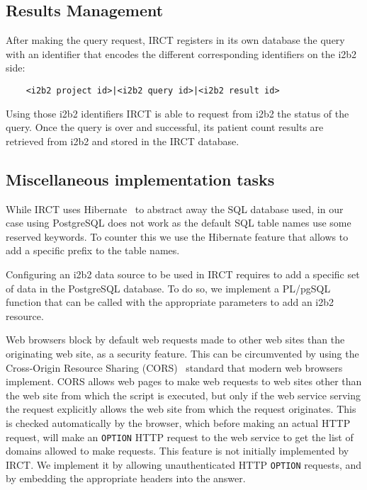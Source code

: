 \subsection{Results Management}

After making the query request, IRCT registers in its own database the query with an identifier that encodes the different corresponding identifiers on the i2b2 side:
\begin{verbatim}
    <i2b2 project id>|<i2b2 query id>|<i2b2 result id>
\end{verbatim}

Using those i2b2 identifiers IRCT is able to request from i2b2 the status of the query.
Once the query is over and successful, its patient count results are retrieved from i2b2 and stored in the IRCT database.


\subsection{Miscellaneous implementation tasks}

While IRCT uses Hibernate~\cite{wiki:hibernate} to abstract away the SQL database used, in our case using PostgreSQL does not work as the default SQL table names use some reserved keywords.
To counter this we use the Hibernate feature that allows to add a specific prefix to the table names.

Configuring an i2b2 data source to be used in IRCT requires to add a specific set of data in the PostgreSQL database.
To do so, we implement a PL/pgSQL function that can be called with the appropriate parameters to add an i2b2 resource.

Web browsers block by default web requests made to other web sites than the originating web site, as a security feature.
This can be circumvented by using the Cross-Origin Resource Sharing (CORS)~\cite{rfc:cors} standard that modern web browsers implement.
CORS allows web pages to make web requests to web sites other than the web site from which the script is executed, but only if the web service serving the request explicitly allows the web site from which the request originates.
This is checked automatically by the browser, which before making an actual HTTP request, will make an \verb|OPTION| HTTP request to the web service to get the list of domains allowed to make requests.
This feature is not initially implemented by IRCT.
We implement it by allowing unauthenticated HTTP \verb|OPTION| requests, and by embedding the appropriate headers into the answer.

